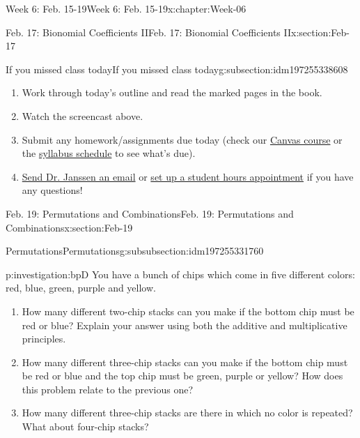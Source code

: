 \documentclass[oneside,10pt,]{book}
\numberwithin{equation}{section}
\begin{document}
\begin{chapterptx}{Week 6: Feb. 15-19}{}{Week 6: Feb. 15-19}{}{}{x:chapter:Week-06}
\begin{sectionptx}{Feb. 17: Bionomial Coefficients II}{}{Feb. 17: Bionomial Coefficients II}{}{}{x:section:Feb-17}
\typeout{************************************************}
%
\begin{subsectionptx}{If you missed class today}{}{If you missed class today}{}{}{g:subsection:idm197255338608}
%
\begin{enumerate}
\item{}Work through today's outline and read the marked pages in the book.%
\item{}Watch the screencast above.%
\item{}Submit any homework\slash{}assignments due today (check our \href{https://dordt.instructure.com/courses/3110050}{Canvas course} or the \href{https://prof.mkjanssen.org/ds/index.html\#schedule}{syllabus schedule} to see what's due).%
\item{}\href{mailto:mike.janssen@dordt.edu}{Send Dr. Janssen an email} or \href{https://calendly.com/mkjanssen/student-hours}{set up a student hours appointment} if you have any questions!%
\end{enumerate}
\end{subsectionptx}
\end{sectionptx}
%
%
\typeout{************************************************}
\typeout{************************************************}
%
\begin{sectionptx}{Feb. 19: Permutations and Combinations}{}{Feb. 19: Permutations and Combinations}{}{}{x:section:Feb-19}
%
%
\typeout{************************************************}
\typeout{************************************************}
%
\begin{subsubsectionptx}{Permutations}{}{Permutations}{}{}{g:subsubsection:idm197255331760}
\begin{investigation}{}{p:investigation:bpD}%
You have a bunch of chips which come in five different colors: red, blue, green, purple and yellow.%
\begin{enumerate}
\item{}How many different two-chip stacks can you make if the bottom chip must be red or blue? Explain your answer using both the additive and multiplicative principles.%
\item{}How many different three-chip stacks can you make if the bottom chip must be red or blue and the top chip must be green, purple or yellow? How does this problem relate to the previous one?%
\item{}How many different three-chip stacks are there in which no color is repeated? What about four-chip stacks?%

\end{enumerate}
\end{investigation}
\end{subsubsectionptx}
\end{sectionptx}
\end{chapterptx}
\end{document}
